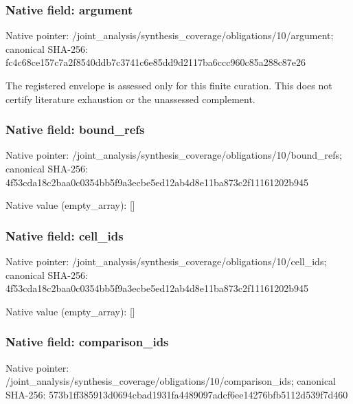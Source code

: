 \documentclass[10pt,a4paper]{article}
\begin{document}
\subsubsection{Native field: argument}


Native pointer: /joint\_analysis/synthesi\allowbreak{}s\_coverage/obligations/1\allowbreak{}0/argument; canonical SHA-256: fc4c68ce157c7a2f8540ddb7\allowbreak{}c3741c6e85dd9d2117ba6ccc\allowbreak{}960c85a288c87e26


The registered envelope is assessed only for this finite curation. This does not certify literature exhaustion or the unassessed complement.


\subsubsection{Native field: bound\_refs}


Native pointer: /joint\_analysis/synthesi\allowbreak{}s\_coverage/obligations/1\allowbreak{}0/bound\_refs; canonical SHA-256: 4f53cda18c2baa0c0354bb5f\allowbreak{}9a3ecbe5ed12ab4d8e11ba87\allowbreak{}3c2f11161202b945



Native value (empty\_array): []



\subsubsection{Native field: cell\_ids}


Native pointer: /joint\_analysis/synthesi\allowbreak{}s\_coverage/obligations/1\allowbreak{}0/cell\_ids; canonical SHA-256: 4f53cda18c2baa0c0354bb5f\allowbreak{}9a3ecbe5ed12ab4d8e11ba87\allowbreak{}3c2f11161202b945



Native value (empty\_array): []



\subsubsection{Native field: comparison\_ids}


Native pointer: /joint\_analysis/synthesi\allowbreak{}s\_coverage/obligations/1\allowbreak{}0/comparison\_ids; canonical SHA-256: 573b1ff385913d0694cbad19\allowbreak{}31fa4489097adcf6ee14276b\allowbreak{}fb5112d539f7d460
\end{document}
